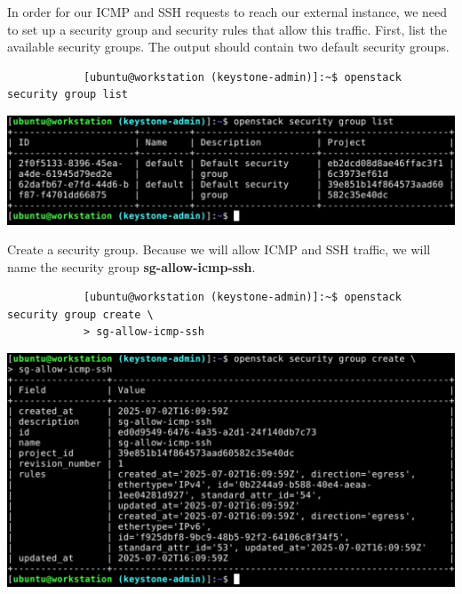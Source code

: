 \documentclass[letterpaper, 12pt]{article}
\begin{document}
\begin{enumerate}
    \begin{labstep}
        In order for our ICMP and SSH requests to reach our external instance, we need to set up a security group and security rules that allow this traffic.
        First, list the available security groups.
        The output should contain two default security groups.
        \begin{lstlisting}
            [ubuntu@workstation (keystone-admin)]:~$ openstack security group list
        \end{lstlisting}

        \begin{center}
            \includegraphics[width=\linewidth]{images/part5/step22.png}
        \end{center}
    \end{labstep}

    \begin{labstep}
        Create a security group.
        Because we will allow ICMP and SSH traffic, we will name the security group \textbf{sg-allow-icmp-ssh}.
        \begin{lstlisting}
            [ubuntu@workstation (keystone-admin)]:~$ openstack security group create \
            > sg-allow-icmp-ssh
        \end{lstlisting}

        \begin{center}
            \includegraphics[width=\linewidth]{images/part5/step23.png}
        \end{center}
    \end{labstep}


\end{enumerate}
\end{document}
